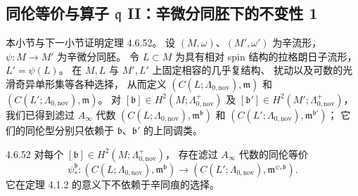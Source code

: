 
\subsection{同伦等价与算子 $\mathfrak q$ II：辛微分同胚下的不变性 1}
\label{subsec:4-6-5}

本小节与下一小节证明定理 4.6.52。
设 $(M,\omega)$、$(M',\omega')$ 为辛流形，
$\psi\colon M\to M'$ 为辛微分同胚。
令 $L\subset M$ 为具有相对 spin 结构的拉格朗日子流形，
$L'=\psi(L)$。
在 $M,L$ 与 $M',L'$ 上固定相容的几乎复结构、
扰动以及可数的光滑奇异单形集等各种选择，
从而定义
$(C(L;\Lambda_{0,\mathrm{nov}}),\mathfrak m)$
和
$(C(L';\Lambda_{0,\mathrm{nov}}),\mathfrak m)$。
对
$[\mathfrak b]\in H^2(M;\Lambda^+_{0,\mathrm{nov}})$
及
$[\mathfrak b']\in H^2(M';\Lambda^+_{0,\mathrm{nov}})$，
我们已得到滤过 $A_\infty$ 代数
$(C(L;\Lambda_{0,\mathrm{nov}}),\mathfrak m^{\mathfrak b})$
和
$(C(L';\Lambda_{0,\mathrm{nov}}),\mathfrak m^{\mathfrak b'})$；
它们的同伦型分别只依赖于
$\mathfrak b$、$\mathfrak b'$ 的上同调类。

\begin{theorem}{4.6.52}\label{thm:4-6-52}
对每个
$[\mathfrak b]\in H^2(M;\Lambda^+_{0,\mathrm{nov}})$，
存在滤过 $A_\infty$ 代数的同伦等价
\[
\psi_*^{\mathfrak b}\colon
(C(L;\Lambda_{0,\mathrm{nov}}),\mathfrak m^{\mathfrak b})
\longrightarrow
(C(L';\Lambda_{0,\mathrm{nov}}),\mathfrak m^{\psi_*\mathfrak b}).
\]
它在定理 4.1.2 的意义下不依赖于辛同痕的选择。
\end{theorem}

